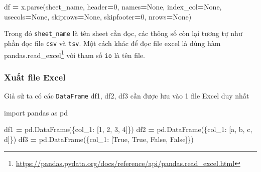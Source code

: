\documentclass[
]{book}
\newenvironment{Shaded}{\begin{snugshade}}{\end{snugshade}}
\newcommand{\DecValTok}[1]{\textcolor[rgb]{0.00,0.00,0.81}{#1}}
\newcommand{\ImportTok}[1]{#1}
\newcommand{\NormalTok}[1]{#1}
\newcommand{\OperatorTok}[1]{\textcolor[rgb]{0.81,0.36,0.00}{\textbf{#1}}}
\newcommand{\StringTok}[1]{\textcolor[rgb]{0.31,0.60,0.02}{#1}}
\newcommand{\VariableTok}[1]{\textcolor[rgb]{0.00,0.00,0.00}{#1}}
\renewcommand{\href}[2]{#2\footnote{\url{#1}}}
\begin{document}
\begin{Shaded}
\begin{Highlighting}[]
\NormalTok{df }\OperatorTok{=}\NormalTok{ x.parse(sheet\_name, header}\OperatorTok{=}\DecValTok{0}\NormalTok{, names}\OperatorTok{=}\VariableTok{None}\NormalTok{, index\_col}\OperatorTok{=}\VariableTok{None}\NormalTok{, usecols}\OperatorTok{=}\VariableTok{None}\NormalTok{, skiprows}\OperatorTok{=}\VariableTok{None}\NormalTok{, skipfooter}\OperatorTok{=}\DecValTok{0}\NormalTok{, nrows}\OperatorTok{=}\VariableTok{None}\NormalTok{)}
\end{Highlighting}
\end{Shaded}

Trong đó \texttt{sheet\_name} là tên sheet cần đọc, các thông số còn lại tương tự như phần đọc file \texttt{csv} và \texttt{tsv}. Một cách khác để đọc file excel là dùng hàm \href{https://pandas.pydata.org/docs/reference/api/pandas.read_excel.html}{pandas.read\_excel} với tham số \texttt{io} là tên file.

\hypertarget{xuux1ea5t-file-excel}{%
\subsubsection{Xuất file Excel}\label{xuux1ea5t-file-excel}}

Giả sử ta có các \texttt{DataFrame} df1, df2, df3 cần được lưu vào 1 file Excel duy nhất

\begin{Shaded}
\begin{Highlighting}[]
\ImportTok{import}\NormalTok{ pandas }\ImportTok{as}\NormalTok{ pd}

\NormalTok{df1 }\OperatorTok{=}\NormalTok{ pd.DataFrame(\{}\StringTok{\textquotesingle{}col\_1\textquotesingle{}}\NormalTok{: [}\DecValTok{1}\NormalTok{, }\DecValTok{2}\NormalTok{, }\DecValTok{3}\NormalTok{, }\DecValTok{4}\NormalTok{]\})}
\NormalTok{df2 }\OperatorTok{=}\NormalTok{ pd.DataFrame(\{}\StringTok{\textquotesingle{}col\_1\textquotesingle{}}\NormalTok{: [}\StringTok{\textquotesingle{}a\textquotesingle{}}\NormalTok{, }\StringTok{\textquotesingle{}b\textquotesingle{}}\NormalTok{, }\StringTok{\textquotesingle{}c\textquotesingle{}}\NormalTok{, }\StringTok{\textquotesingle{}d\textquotesingle{}}\NormalTok{]\})}
\NormalTok{df3 }\OperatorTok{=}\NormalTok{ pd.DataFrame(\{}\StringTok{\textquotesingle{}col\_1\textquotesingle{}}\NormalTok{: [}\VariableTok{True}\NormalTok{, }\VariableTok{True}\NormalTok{, }\VariableTok{False}\NormalTok{, }\VariableTok{False}\NormalTok{]\})}
\end{Highlighting}
\end{Shaded}
\end{document}
